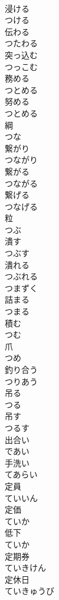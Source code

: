 \documentclass[8pt]{extreport}
\begin{document}
\begin{CJK}{UTF8}{min}
\\	浸ける 
\\	つける	
\\	伝わる 
\\	つたわる	
\\	突っ込む 
\\	つっこむ	
\\	務める 
\\	つとめる	
\\	努める 
\\	つとめる	
\\	綱 
\\	つな	
\\	繋がり 
\\	つながり	
\\	繋がる 
\\	つながる	
\\	繋げる 
\\	つなげる	
\\	粒 
\\	つぶ	
\\	潰す 
\\	つぶす	
\\	潰れる 
\\	つぶれる	
\\	つまずく	
\\	詰まる 
\\	つまる	
\\	積む 
\\	つむ	
\\	爪 
\\	つめ	
\\	釣り合う 
\\	つりあう	
\\	吊る 
\\	つる	
\\	吊す 
\\	つるす	
\\	出合い 
\\	であい	
\\	手洗い 
\\	てあらい	
\\	定員 
\\	ていいん	
\\	定価 
\\	ていか	
\\	低下 
\\	ていか	
\\	定期券 
\\	ていきけん	
\\	定休日 
\\	ていきゅうび	

\end{CJK}
\end{document}
